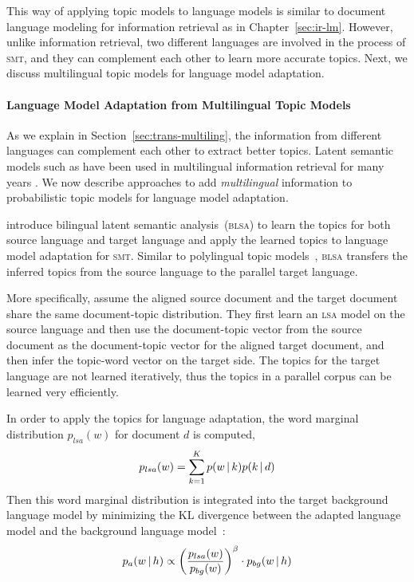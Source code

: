 This way of applying topic models to language models is 
similar to document language modeling for information retrieval
as in Chapter~\ref{sec:ir-lm}. However, unlike
information retrieval, two different languages are involved in the
process of \textsc{smt}, and they can complement each other to learn
more accurate topics. Next, we discuss multilingual topic models
for language model adaptation.

\paragraph{Language Model Adaptation from Multilingual Topic Models}


As we explain in Section~\ref{sec:trans-multiling}, the information
from different languages can complement each other to extract better
topics. Latent semantic models such as  have been used in
multilingual information retrieval for many years
\citep{carbonell1997translingual}.
We now describe approaches to add \emph{multilingual} information to probabilistic topic models
for language model adaptation.

\citet{Tam-2007} introduce bilingual latent semantic
analysis~(\textsc{blsa}) to learn the topics for both source language
and target language and apply the learned topics to language model
adaptation for \textsc{smt}. Similar to polylingual topic models~\citep{mimno-09}, 
\textsc{blsa} transfers the inferred
topics from the source language to the parallel target language.

More specifically, \citet{Tam-2007} assume the aligned source document
and the target document share the same document-topic distribution.
They first learn an \textsc{lsa} model on the source
language and then use the document-topic vector from the
source document as the document-topic vector for the aligned
target document, and then infer the topic-word vector on the
target side. The topics for the target language are not learned
iteratively, thus the topics in a parallel corpus can be learned very
efficiently.

In order to apply the topics for language adaptation, the word
marginal distribution $p_{lsa}(w)$ for document $d$ is computed,
\begin{align}
p_{lsa}(w) = \sum_{k=1}^K p(w \, | \, k) p(k \, | \, d)
\end{align}
Then this word marginal distribution is integrated into the target
background language model by minimizing the KL divergence between the
adapted language model and the background language
model~\citep{Kneser-1997b}:
\begin{align}
\label{eq:mdi}
p_a(w \, | \, h) \propto \left( \frac{p_{lsa}(w)}{p_{bg}(w)} \right) ^{\beta}
  \cdot p_{bg}(w \, | \, h)
\end{align}

